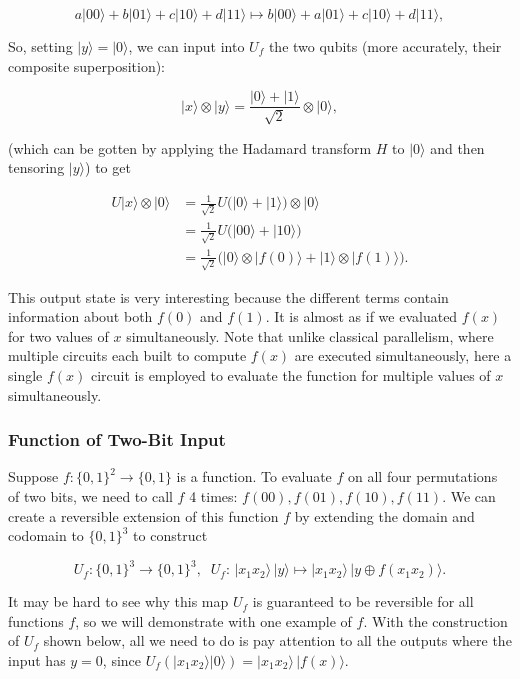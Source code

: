 \documentclass{article}
\theoremstyle{definition}
\begin{document}
        \[a |00\rangle + b|01\rangle + c|10\rangle + d|11\rangle \mapsto b |00\rangle + a|01\rangle + c|10\rangle + d|11\rangle,\]

      So, setting $|y\rangle = |0\rangle$, we can input into $U_f$ the two qubits (more accurately, their composite superposition):

        \[|x \rangle \otimes |y\rangle = \frac{|0\rangle + |1\rangle}{\sqrt{2}} \otimes |0\rangle,\]

      (which can be gotten by applying the Hadamard transform $H$ to $|0\rangle$ and then tensoring $|y\rangle$) to get

      \begin{align*}
        U |x\rangle \otimes |0\rangle & = \frac{1}{\sqrt{2}} U \big( |0\rangle + |1\rangle \big) \otimes |0\rangle \\
        & = \frac{1}{\sqrt{2}} U \big( |00\rangle + |10\rangle \big) \\
        & = \frac{1}{\sqrt{2}} \big( |0\rangle \otimes |f(0)\rangle + |1\rangle \otimes |f(1)\rangle \big).
      \end{align*}

      This output state is very interesting because the different terms contain information about both $f(0)$ and $f(1)$. It is almost as if we evaluated $f(x)$ for two values of $x$ simultaneously. Note that unlike classical parallelism, where multiple circuits each built to compute $f(x)$ are executed simultaneously, here a single $f(x)$ circuit is employed to evaluate the function for multiple values of $x$ simultaneously.

      \subsubsection{Function of Two-Bit Input}

      Suppose $f: \{0, 1\}^2 \longrightarrow \{0, 1\}$ is a function. To evaluate $f$ on all four permutations of two bits, we need to call $f$ 4 times: $f(00), f(01), f(10), f(11)$. We can create a reversible extension of this function $f$ by extending the domain and codomain to $\{0, 1\}^3$ to construct

        \[U_f: \{0, 1\}^3 \longrightarrow \{0, 1\}^3, \;\; U_f: \, |x_1 x_2 \rangle\,|y\rangle \mapsto |x_1 x_2 \rangle\, |y \oplus f(x_1 x_2) \rangle.\]

      It may be hard to see why this map $U_f$ is guaranteed to be reversible for all functions $f$, so we will demonstrate with one example of $f$. With the construction of $U_f$ shown below, all we need to do is pay attention to all the outputs where the input has $y=0$, since $U_f (|x_1 x_2 \rangle |0\rangle) = |x_1 x_2 \rangle \, |f(x) \rangle$.
\end{document}
